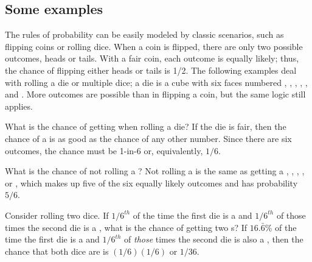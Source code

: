 \subsection{Some examples}

The rules of probability can be easily modeled by classic scenarios, such as flipping coins or rolling dice. When a coin is flipped, there are only two possible outcomes, heads or tails. With a fair coin, each outcome is equally likely; thus, the chance of flipping either heads or tails is 1/2. The following examples deal with rolling a die or multiple dice; a die is a cube with six faces numbered , , , , , and . More outcomes are possible than in flipping a coin, but the same logic still applies.

\begin{example}{What is the chance of getting  when rolling a die?}\label{probOf1}
If the die is fair, then the chance of a  is as good as the chance of any other number. Since there are six outcomes, the chance must be 1-in-6 or, equivalently, $1/6$.
\end{example}

\begin{example}{What is the chance of not rolling a ?}\label{probNot2}
Not rolling a  is the same as getting a , , , , or , which makes up five of the six equally likely outcomes and has probability $5/6$.
\end{example}

\begin{example} {Consider rolling two dice. If $1/6^{th}$ of the time the first die is a  and $1/6^{th}$ of those times the second die is a , what is the chance of getting two s?}\label{probOf2Ones}
If $16.\bar{6}$\% of the time the first die is a  and $1/6^{th}$ of \emph{those} times the second die is also a , then the chance that both dice are  is $(1/6) (1/6)$ or $1/36$.
\end{example}

